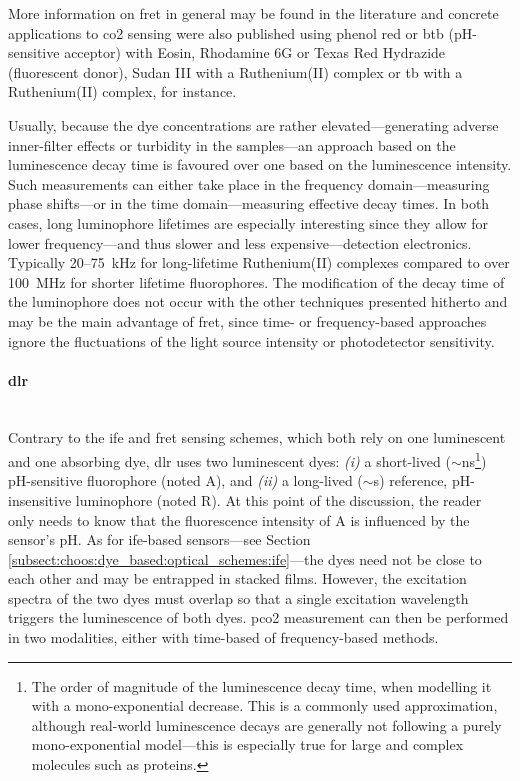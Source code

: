 More information on \gls{fret} in general may be found in the literature\cite{mills2009, valeur2001_chap9} and concrete applications to \gls{co2} sensing were also published using phenol red or \gls{btb} (pH-sensitive acceptor) with Eosin, Rhodamine 6G or Texas Red Hydrazide (fluorescent donor)\cite{lakowicz1993}, Sudan III with a Ruthenium(II) complex\cite{bultzingslowen2003} or \gls{tb} with a Ruthenium(II) complex\cite{neurauter1999}, for instance.

Usually, because the dye concentrations are rather elevated---generating adverse inner-filter effects or turbidity in the samples---an approach based on the luminescence decay time is favoured over one based on the luminescence intensity. Such measurements can either take place in the frequency domain---measuring phase shifts\cite{lakowicz1993, bultzingslowen2003}---or in the time domain---measuring effective decay times\cite{neurauter1999}. In both cases, long luminophore lifetimes are especially interesting since they allow for lower frequency---and thus slower and less expensive---detection electronics. Typically 20--75~kHz for long-lifetime Ruthenium(II) complexes\cite{bultzingslowen2003, neurauter1999} compared to over 100~MHz for shorter lifetime fluorophores\cite{lakowicz1993}. The modification of the decay time of the luminophore does not occur with the other techniques presented hitherto and may be the main advantage of \gls{fret}, since time- or frequency-based approaches ignore the fluctuations of the light source intensity or photodetector sensitivity.

\paragraph{\texorpdfstring{\gls{dlr}}{DLR}}\label{subsect:choos:dye_based:optical_schemes:dlr_intro}\mbox{}\\

Contrary to the \gls{ife} and \gls{fret} sensing schemes, which both rely on one luminescent and one absorbing dye, \gls{dlr} uses two luminescent dyes: \textit{(i)} a short-lived ($\sim$ns\footnote{The order of magnitude of the luminescence decay time, when modelling it with a mono-exponential decrease. This is a commonly used approximation, although real-world luminescence decays are generally not following a purely mono-exponential model---this is especially true for large and complex molecules such as proteins\cite{wlodarczyk2003}.\label{footnote:monoexp}}) pH-sensitive fluorophore (noted A), and \textit{(ii)} a long-lived ($\sim${\textmu}s) reference, pH-insensitive luminophore (noted R). At this point of the discussion, the reader only needs to know that the fluorescence intensity of A is influenced by the sensor's pH. As for \gls{ife}-based sensors---see Section \ref{subsect:choos:dye_based:optical_schemes:ife}---the dyes need not be close to each other and may be entrapped in stacked films\cite{aguayolopez2014}. However, the excitation spectra of the two dyes must overlap so that a single excitation wavelength triggers the luminescence of both dyes. \gls{pco2} measurement can then be performed in two modalities, either with time-based of frequency-based methods.

